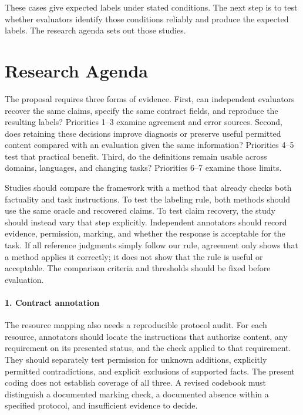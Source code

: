 \documentclass{clv2025}
\begin{document}
These cases give expected labels under stated conditions. The next step is
to test whether evaluators identify those conditions reliably and produce
the expected labels. The research agenda sets out those studies.


\section{Research Agenda}\label{sec:agenda}

The proposal requires three forms of evidence. First, can independent
evaluators recover the same claims, specify the same contract fields, and
reproduce the resulting labels? Priorities 1--3 examine agreement and error
sources. Second, does retaining these decisions improve diagnosis or preserve
useful permitted content compared with an evaluation given the same
information? Priorities 4--5 test that practical benefit. Third, do the
definitions remain usable across domains, languages, and changing tasks?
Priorities 6--7 examine those limits.

Studies should compare the framework with a method that already checks both
factuality and task instructions. To test the labeling rule, both methods
should use the same oracle and recovered claims. To test claim recovery,
the study should instead vary that step explicitly. Independent annotators
should record evidence, permission, marking, and whether the response is
acceptable for the task. If all reference judgments simply follow our rule,
agreement only shows that a method applies it correctly; it does not show
that the rule is useful or acceptable. The comparison criteria and thresholds
should be fixed before evaluation.



\paragraph{1. Contract annotation}
The resource mapping also needs a reproducible protocol audit. For each
resource, annotators should locate the instructions that authorize content,
any requirement on its presented status, and the check applied to that
requirement. They should separately test permission for unknown additions,
explicitly permitted contradictions, and explicit exclusions of supported
facts. The present coding does not establish coverage of all three. A
revised codebook must distinguish a documented marking check, a documented
absence within a specified protocol, and insufficient evidence to decide.
\end{document}
